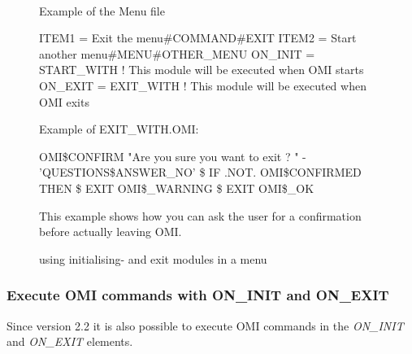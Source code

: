 \documentclass[a4paper]{book}
\renewcommand{\indent}{\hspace*{5mm}}
\begin{document}
\begin{figure}[ht]
\begin{minipage}[t]{\textwidth}
\hrulefill \\
\noindent Example of the Menu file\newline
\begin{ttfamily}\begin{small}
 \newline
\indent ITEM1 = Exit the menu{\#}COMMAND{\#}EXIT \newline
\indent ITEM2 = Start another menu{\#}MENU{\#}OTHER{\_}MENU \newline
\indent ON{\_}INIT = START{\_}WITH ! This module will be executed when OMI starts \newline
\indent ON{\_}EXIT = EXIT{\_}WITH ! This module will be executed when OMI exits \newline
\end{small}\end{ttfamily}
\vspace{1mm} 
\noindent Example of EXIT{\_}WITH.OMI:\newline
\begin{ttfamily}\begin{small}
\noindent{\$} OMI{\$}CONFIRM "Are you sure you want to exit ? " - \newline
\indent 'QUESTIONS{\$}ANSWER{\_}NO'
{\$} IF .NOT. OMI{\$}CONFIRMED THEN {\$} EXIT OMI{\$}{\_}WARNING \newline
{\$} EXIT OMI{\$}{\_}OK\newline
\end{small}\end{ttfamily}
\noindent This example shows how you can ask the user for a confirmation before 
actually leaving OMI.
\caption{using initialising- and exit modules in a menu}\label{fig:iemods}
\hrulefill
\end{minipage}
\end{figure}

\subsubsection{Execute OMI commands with ON{\_}INIT and ON{\_}EXIT}

Since version 2.2 it is also possible to execute OMI commands in the
\textsl{ON{\_}INIT} and
\textsl{ON{\_}EXIT} elements.
\end{document}
